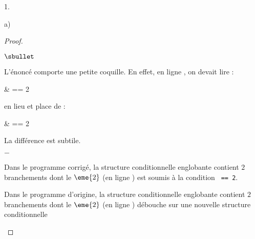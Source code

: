 \documentclass[11pt]{article}%
\begin{document}
\begin{noliste}{1.}
\begin{noliste}{a)}
\begin{proof}
      \begin{remark}
        \begin{noliste}{$\sbullet$}
        \item L'énoncé comporte une petite coquille. En effet, en
          ligne , on devait lire :
          \begin{scilabC}{8}
            & \quad {}  == 2 
            \nl %
          \end{scilabC}
          en lieu et place de :
          \begin{scilabC}{8}
            & \quad {}  == 2 
            \nl %
          \end{scilabC}
        \item La différence est subtile.
          \begin{noliste}{$-$}
          \item Dans le programme corrigé, la structure conditionnelle
            englobante contient $2$ branchements dont le $\eme{2}$ (en
            ligne ) est soumis à la condition {\tt
               == 2}.
          \item Dans le programme d'origine, la structure
            conditionnelle englobante contient $2$ branchements dont
            le $\eme{2}$ (en ligne ) débouche sur une
            nouvelle structure conditionnelle {\tt {}
}
\end{noliste}
\end{noliste}
\end{remark}
\end{proof}
\end{noliste}
\end{noliste}
\end{document}
